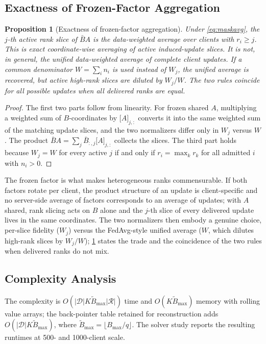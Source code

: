 \documentclass[a4paper,fleqn]{cas-dc}
\newtheorem{proposition}{Proposition}
\begin{document}
\subsection{Exactness of Frozen-Factor Aggregation}
\begin{proposition}[Exactness of frozen-factor aggregation]
\label{prop:agg}
Under \cref{eq:maskavg}, the $j$-th active rank slice of $\bar BA$ is the data-weighted average over clients with $r_i\ge j$. This is exact coordinate-wise averaging of active induced-update slices. It is not, in general, the unified data-weighted average of complete client updates. If a common denominator $W=\sum_i n_i$ is used instead of $W_j$, the unified average is recovered, but active high-rank slices are diluted by $W_j/W$. The two rules coincide for all possible updates when all delivered ranks are equal.
\end{proposition}
\begin{proof}
The first two parts follow from linearity. For frozen shared $A$, multiplying a weighted sum of $B$-coordinates by $\big[A\big]_{j,:}$ converts it into the same weighted sum of the matching update slices, and the two normalizers differ only in $W_j$ versus $W$. The product $\bar BA=\sum_j\bar B_{:,j}\big[A\big]_{j,:}$ collects the slices. The third part holds because $W_j=W$ for every active $j$ if and only if $r_i=\max_k r_k$ for all admitted $i$ with $n_i>0$.
\end{proof}
The frozen factor is what makes heterogeneous ranks commensurable. If both factors rotate per client, the product structure of an update is client-specific and no server-side average of factors corresponds to an average of updates; with $A$ shared, rank slicing acts on $B$ alone and the $j$-th slice of every delivered update lives in the same coordinates. The two normalizers then embody a genuine choice, per-slice fidelity ($W_j$) versus the FedAvg-style unified average ($W$, which dilutes high-rank slices by $W_j/W$); \cref{prop:agg} states the trade and the coincidence of the two rules when delivered ranks do not mix.
\subsection{Complexity Analysis}
The complexity is $O(|\mathcal D|K\widetilde B_{\max}|\mathcal R|)$ time and $O(K\widetilde B_{\max})$ memory with rolling value arrays; the back-pointer table retained for reconstruction adds $O(|\mathcal D|K\widetilde B_{\max})$, where $\widetilde B_{\max}=\lfloor B_{\max}/q\rfloor$. The solver study reports the resulting runtimes at 500- and 1000-client scale.
\end{document}
